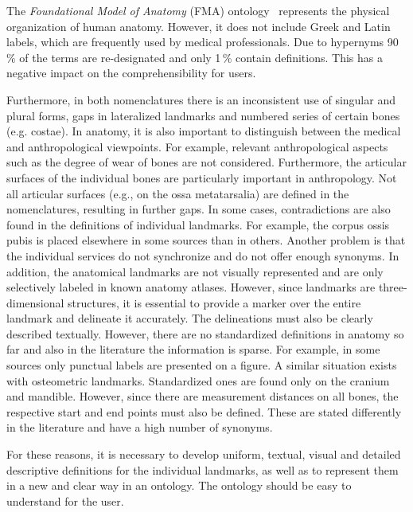 \documentclass[sw]{iosart2x}
\begin{document}
The \emph{Foundational Model of Anatomy} (FMA) ontology~\citep{fma} represents the physical organization of human anatomy.
However, it does not include Greek and Latin labels, which are frequently used by medical professionals.
Due to hypernyms 90\,\% of the terms are re-designated and only 1\,\% contain definitions.
This has a negative impact on the comprehensibility for users.

Furthermore, in both nomenclatures there is an inconsistent use of singular and plural forms, gaps in lateralized landmarks and numbered series of certain bones (e.g. costae).
In anatomy, it is also important to distinguish between the medical and anthropological viewpoints.
For example, relevant anthropological aspects such as the degree of wear of bones are not considered.
Furthermore, the articular surfaces of the individual bones are particularly important in anthropology.
Not all articular surfaces (e.g., on the ossa metatarsalia) are defined in the nomenclatures, resulting in further gaps.
In some cases, contradictions are also found in the definitions of individual landmarks.
For example, the corpus ossis pubis is placed elsewhere in some sources than in others.
Another problem is that the individual services do not synchronize and do not offer enough synonyms. %
In addition, the anatomical landmarks are not visually represented and are only selectively labeled in known anatomy atlases.
However, since landmarks are three-dimensional structures, it is essential to provide a marker over the entire landmark and delineate it accurately.
The delineations must also be clearly described textually.
However, there are no standardized definitions in anatomy so far and also in the literature the information is sparse.
For example, in some sources only punctual labels are presented on a figure.
A similar situation exists with osteometric landmarks.
Standardized ones are found only on the cranium and mandible.
However, since there are measurement distances on all bones, the respective start and end points must also be defined.
These are stated differently in the literature and have a high number of synonyms.

For these reasons, it is necessary to develop uniform, textual, visual and detailed descriptive definitions for the individual landmarks, as well as to represent them in a new and clear way in an ontology.
The ontology should be easy to understand for the user.
\end{document}
